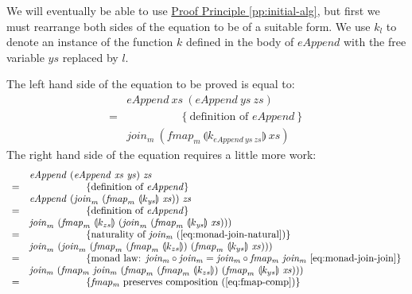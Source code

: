 \documentclass{jfp1}
\newcommand{\fold}[1]{\llparenthesis #1 \rrparenthesis}
\newcommand{\eqAnnotation}[1]{\hspace{2cm}\left\{\textrm{#1}\right\}}
\newcommand{\proofprinref}[1]{\hyperref[#1]{Proof Principle \ref*{#1}}}
\begin{document}
\begin{proof*}
  We will eventually be able to use \proofprinref{pp:initial-alg}, but
  first we must rearrange both sides of the equation to be of a
  suitable form. We use $k_l$ to denote an instance of the function
  $k$ defined in the body of $\mathit{eAppend}$ with the free variable
  $\mathit{ys}$ replaced by $l$.

  The left hand side of the equation to be proved is equal to:
  \begin{displaymath}
    \begin{array}{cl}
       &\mathit{eAppend}~\mathit{xs}~(\mathit{eAppend}~\mathit{ys}~\mathit{zs})
      \\ =&\eqAnnotation{definition of $\mathit{eAppend}$}
      \\ &\mathit{join_m}~(\mathit{fmap_m}~\fold{k_{\mathit{eAppend}~\mathit{ys}~\mathit{zs}}}~\mathit{xs})
    \end{array}
  \end{displaymath}
  The right hand side of the equation requires a little more work:
  \begin{displaymath}
    \begin{array}{cl}
      &\mathit{eAppend}~(\mathit{eAppend}~\mathit{xs}~\mathit{ys})~\mathit{zs}
      \\ =&\eqAnnotation{definition of $\mathit{eAppend}$}
      \\ &\mathit{eAppend}~(\mathit{join}_m~(\mathit{fmap}_m~\fold{k_{\mathit{ys}}}~\mathit{xs}))~\mathit{zs}
      \\ =&\eqAnnotation{definition of $\mathit{eAppend}$}
      \\ &\mathit{join}_m~(\mathit{fmap}_m~\fold{k_{zs}}~(\mathit{join}_m~(\mathit{fmap}_m~\fold{k_{\mathit{ys}}}~\mathit{xs})))
      \\ =&\eqAnnotation{naturality of $\mathit{join_m}$
        (\autoref{eq:monad-join-natural})}
      \\ &\mathit{join}_m~(\mathit{join}_m~(\mathit{fmap}_m~(\mathit{fmap}_m~\fold{k_{zs}})~(\mathit{fmap}_m~\fold{k_{ys}}~\mathit{xs})))
      \\ =&\eqAnnotation{monad law:
$\mathit{join_m} \circ \mathit{join_m} = \mathit{join_m} \circ \mathit{fmap_m}~\mathit{join_m}$ 
\autoref{eq:monad-join-join}} \\
      &\mathit{join_m}~(\mathit{fmap_m}~\mathit{join_m}~(\mathit{fmap}_m~(\mathit{fmap}_m~\fold{k_{zs}})~(\mathit{fmap}_m~\fold{k_{ys}}~\mathit{xs}))) \\
      =&\eqAnnotation{$\mathit{fmap_m}$ preserves composition (\autoref{eq:fmap-comp})} \\

\end{array}
\end{displaymath}
\end{proof*}
\end{document}
